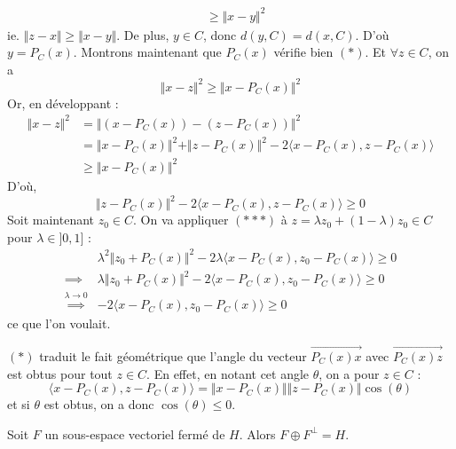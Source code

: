 \begin{demonstration}
\begin{align*}
			&\geq \Vert x - y \Vert^2 
		\end{align*}
		ie. $\Vert z - x \Vert \geq \Vert x - y \Vert$. De plus, $y \in C$, donc $d(y, C) = d(x, C)$. D'où $y = P_C(x)$.
		\newpar
		Montrons maintenant que $P_C(x)$ vérifie bien $(*)$. Et $\forall z \in C$, on a
		\[ \Vert x - z \Vert^2 \geq \Vert x - P_C(x) \Vert^2 \]
		Or, en développant :
		\begin{align*}
			\Vert x - z \Vert^2 &= \Vert (x - P_C(x)) - (z - P_C(x)) \Vert^2 \\
			&= \Vert x - P_C(x) \Vert^2 + \Vert z - P_C(x) \Vert^2 - 2 \langle x - P_C(x), z - P_C(x) \rangle \\
			&\geq \Vert x - P_C(x) \Vert^2
		\end{align*}
		D'où,
		\[ \Vert z - P_C(x) \Vert^2 - 2 \langle x - P_C(x), z - P_C(x) \rangle \geq 0 \tag{$***$} \]
		Soit maintenant $z_0 \in C$. On va appliquer $(***)$ à $z = \lambda z_0 + (1 - \lambda) z_0 \in C$ pour $\lambda \in ]0, 1]$ :
		\begin{align*}
			& \lambda^2 \Vert z_0 + P_C(x) \Vert^2 -2 \lambda \langle x - P_C(x), z_0 - P_C(x) \rangle \geq 0 \\
			\implies& \lambda \Vert z_0 + P_C(x) \Vert^2 -2 \langle x - P_C(x), z_0 - P_C(x) \rangle \geq 0 \\
			\overset{\lambda \longrightarrow 0}{\implies}& -2 \langle x - P_C(x), z_0 - P_C(x) \rangle \geq 0
		\end{align*}
		ce que l'on voulait.
	\end{demonstration}

	\begin{remark}
		$(*)$ traduit le fait géométrique que l'angle du vecteur $\overrightarrow{P_C(x)x}$ avec $\overrightarrow{P_C(x)z}$ est obtus pour tout $z \in C$. En effet, en notant cet angle $\theta$, on a pour $z \in C$ :
		\[ \langle x - P_C(x), z - P_C(x) \rangle = \Vert x - P_C(x) \Vert \Vert z - P_C(x) \Vert \cos (\theta) \]
		et si $\theta$ est obtus, on a donc $\cos (\theta) \leq 0$.
	\end{remark}

	\begin{corollary}
		Soit $F$ un sous-espace vectoriel fermé de $H$. Alors $F \oplus F^\perp = H$.
	\end{corollary}

